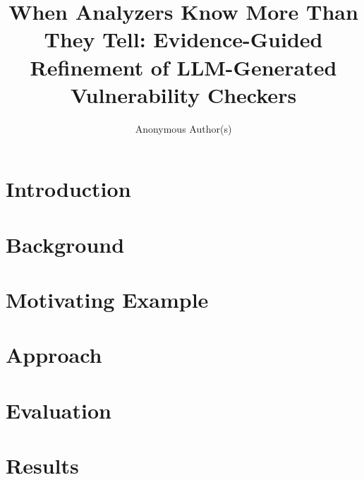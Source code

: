 \documentclass[acmsmall,screen,review,anonymous]{acmart}
\begin{document}
\title[When Analyzers Know More Than They Tell]{When Analyzers Know More Than They Tell: Evidence-Guided Refinement of LLM-Generated Vulnerability Checkers}

\author{Anonymous Author(s)}

\begin{abstract}

\end{abstract}
\maketitle


\section{Introduction}\label{sec:intro}


\section{Background}\label{sec:background}


\section{Motivating Example}\label{sec:motivating}


\FloatBarrier
\section{Approach}\label{sec:approach}


\FloatBarrier
\section{Evaluation}\label{sec:evaluation}




\FloatBarrier
\section{Results}\label{sec:results}

\end{document}
